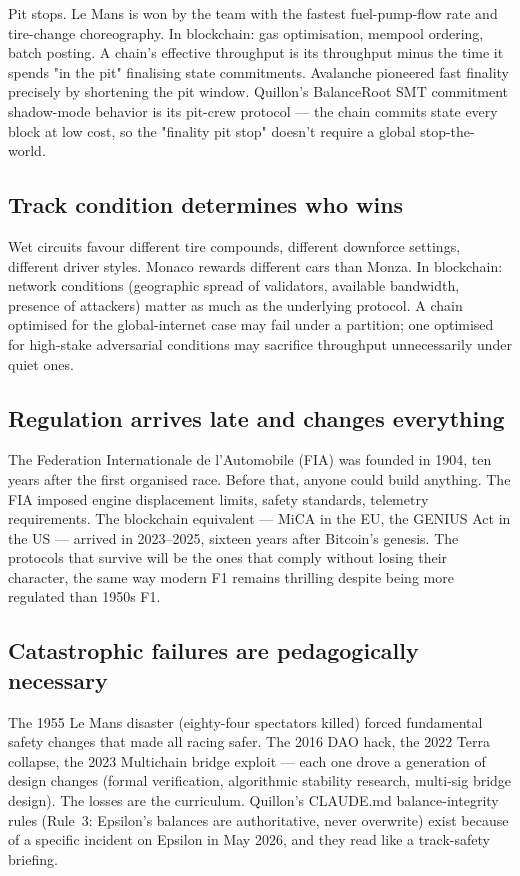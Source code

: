 \documentclass[11pt,a4paper]{article}
\begin{document}
Pit stops. Le Mans is won by the team with the fastest fuel-pump-flow
rate and tire-change choreography. In blockchain: gas optimisation,
mempool ordering, batch posting. A chain's effective throughput is
its throughput minus the time it spends "in the pit" finalising
state commitments. Avalanche pioneered fast finality precisely by
shortening the pit window. Quillon's BalanceRoot SMT commitment
shadow-mode behavior is its pit-crew protocol --- the chain commits
state every block at low cost, so the "finality pit stop" doesn't
require a global stop-the-world.

\subsection{Track condition determines who wins}

Wet circuits favour different tire compounds, different downforce
settings, different driver styles. Monaco rewards different cars than
Monza. In blockchain: network conditions (geographic spread of
validators, available bandwidth, presence of attackers) matter as much
as the underlying protocol. A chain optimised for the global-internet
case may fail under a partition; one optimised for high-stake
adversarial conditions may sacrifice throughput unnecessarily under
quiet ones.

\subsection{Regulation arrives late and changes everything}

The Federation Internationale de l'Automobile (FIA) was founded in 1904,
ten years after the first organised race. Before that, anyone could
build anything. The FIA imposed engine displacement limits, safety
standards, telemetry requirements. The blockchain equivalent --- MiCA in
the EU, the GENIUS Act in the US --- arrived in 2023--2025, sixteen
years after Bitcoin's genesis. The protocols that survive will be the
ones that comply without losing their character, the same way modern F1
remains thrilling despite being more regulated than 1950s F1.

\subsection{Catastrophic failures are pedagogically necessary}

The 1955 Le Mans disaster (eighty-four spectators killed) forced
fundamental safety changes that made all racing safer. The 2016 DAO
hack, the 2022 Terra collapse, the 2023 Multichain bridge exploit ---
each one drove a generation of design changes (formal verification,
algorithmic stability research, multi-sig bridge design). The losses
are the curriculum. Quillon's CLAUDE.md balance-integrity rules
(Rule~3: Epsilon's balances are authoritative, never overwrite) exist
because of a specific incident on Epsilon in May 2026, and they read
like a track-safety briefing.
\end{document}
